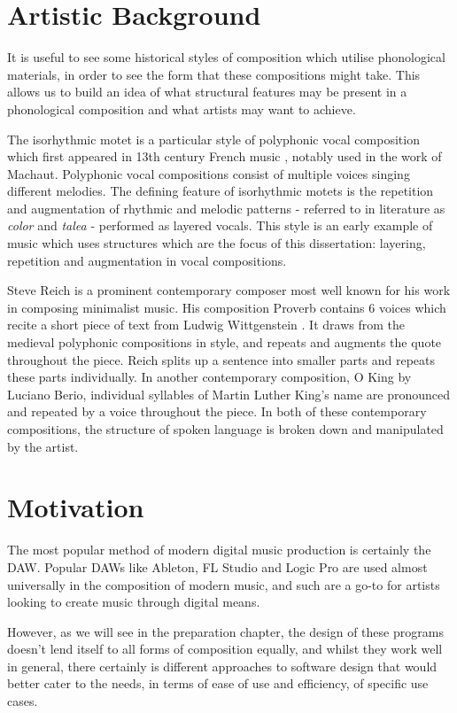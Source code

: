 \documentclass[12pt,a4paper,twoside,openright]{report}
\begin{document}
\section{Artistic Background}
It is useful to see some historical styles of composition which utilise phonological materials, in order to see the form that these compositions might take. This allows us to build an idea of what structural features may be present in a phonological composition and what artists may want to achieve.

The isorhythmic motet is a particular style of polyphonic vocal composition which first appeared in 13th century French music \cite{Bent01}, notably used in the work of Machaut. Polyphonic vocal compositions consist of multiple voices singing different melodies. The defining feature of isorhythmic motets is the repetition and augmentation of rhythmic and melodic patterns - referred to in literature as \textit{color} and \textit{talea} - performed as layered vocals. This style is an early example of music which uses structures which are the focus of this dissertation: layering, repetition and augmentation in vocal compositions.

Steve Reich is a prominent contemporary composer most well known for his work in composing minimalist music. His composition Proverb contains 6 voices which recite a short piece of text from Ludwig Wittgenstein \cite{ReichProverb}. It draws from the medieval polyphonic compositions in style, and repeats and augments the quote throughout the piece. Reich splits up a sentence into smaller parts and repeats these parts individually. In another contemporary composition, O King by Luciano Berio, individual syllables of Martin Luther King's name are pronounced and repeated by a voice throughout the piece. In both of these contemporary compositions, the structure of spoken language is broken down and manipulated by the artist.

\section{Motivation}
 The most popular method of modern digital music production is certainly the DAW. Popular DAWs like Ableton, FL Studio and Logic Pro are used almost universally in the composition of modern music, and such are a go-to for artists looking to create music through digital means.

 However, as we will see in the preparation chapter, the design of these programs doesn't lend itself to all forms of composition equally, and whilst they work well in general, there certainly is different approaches to software design that would better cater to the needs, in terms of ease of use and efficiency, of specific use cases.
\end{document}
